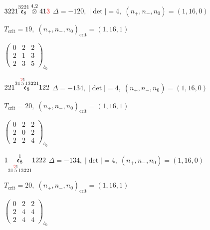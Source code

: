 \documentclass[10pt]{article}
\begin{document}
\smallskip

$3221\overset{3221}{\mathfrak{e}_8}\overset{4,2}{\otimes}41\textcolor{red}{3}$ \quad $\Delta=-120,\; |\det|=4,\; (n_+,n_-,n_0)=(1,16,0)$

\hspace{1em}$T_{\text{crit}}=19,\; (n_+,n_-,n_0)_{\text{crit}}=(1,16,1)$

\hspace{2em}$\left(\begin{smallmatrix}0 & 2 & 2 \\ 2 & 1 & 3 \\ 2 & 3 & 5\end{smallmatrix}\right)_{\!b_0}$

\smallskip

$221\overset{31\overset{\textcolor{red}{3}1}{5}13221}{\mathfrak{e}_8}122$ \quad $\Delta=-134,\; |\det|=4,\; (n_+,n_-,n_0)=(1,16,0)$

\hspace{1em}$T_{\text{crit}}=20,\; (n_+,n_-,n_0)_{\text{crit}}=(1,16,1)$

\hspace{2em}$\left(\begin{smallmatrix}0 & 2 & 2 \\ 2 & 0 & 2 \\ 2 & 2 & 4\end{smallmatrix}\right)_{\!b_0}$

\smallskip

$1\overset{1}{\underset{31\overset{\textcolor{red}{3}1}{5}13221}{\mathfrak{e}_8}}1222$ \quad $\Delta=-134,\; |\det|=4,\; (n_+,n_-,n_0)=(1,16,0)$

\hspace{1em}$T_{\text{crit}}=20,\; (n_+,n_-,n_0)_{\text{crit}}=(1,16,1)$

\hspace{2em}$\left(\begin{smallmatrix}0 & 2 & 2 \\ 2 & 4 & 4 \\ 2 & 4 & 4\end{smallmatrix}\right)_{\!b_0}$

\smallskip
\end{document}

